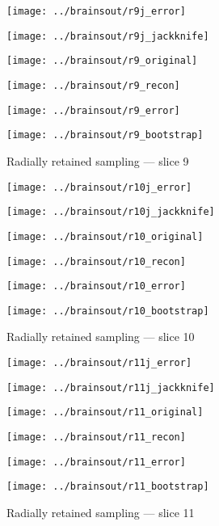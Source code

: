 \documentclass[review,supplement,onefignum,onetabnum,juq]{siamonline181217}
\begin{document}
\begin{figure}
\begin{centering}

\parbox{\imsize}{\texttt{[image: ../brainsout/r9j\_error]}}
\parbox{\imsize}{\texttt{[image: ../brainsout/r9j\_jackknife]}}

\vspace{\vertsep}

\parbox{\imsize}{\texttt{[image: ../brainsout/r9\_original]}}
\parbox{\imsize}{\texttt{[image: ../brainsout/r9\_recon]}}

\vspace{\vertsep}

\parbox{\imsize}{\texttt{[image: ../brainsout/r9\_error]}}
\parbox{\imsize}{\texttt{[image: ../brainsout/r9\_bootstrap]}}

\end{centering}
\caption{Radially retained sampling --- slice 9}
\end{figure}


\begin{figure}
\begin{centering}

\parbox{\imsize}{\texttt{[image: ../brainsout/r10j\_error]}}
\parbox{\imsize}{\texttt{[image: ../brainsout/r10j\_jackknife]}}

\vspace{\vertsep}

\parbox{\imsize}{\texttt{[image: ../brainsout/r10\_original]}}
\parbox{\imsize}{\texttt{[image: ../brainsout/r10\_recon]}}

\vspace{\vertsep}

\parbox{\imsize}{\texttt{[image: ../brainsout/r10\_error]}}
\parbox{\imsize}{\texttt{[image: ../brainsout/r10\_bootstrap]}}

\end{centering}
\caption{Radially retained sampling --- slice 10}
\end{figure}


\begin{figure}
\begin{centering}

\parbox{\imsize}{\texttt{[image: ../brainsout/r11j\_error]}}
\parbox{\imsize}{\texttt{[image: ../brainsout/r11j\_jackknife]}}

\vspace{\vertsep}

\parbox{\imsize}{\texttt{[image: ../brainsout/r11\_original]}}
\parbox{\imsize}{\texttt{[image: ../brainsout/r11\_recon]}}

\vspace{\vertsep}

\parbox{\imsize}{\texttt{[image: ../brainsout/r11\_error]}}
\parbox{\imsize}{\texttt{[image: ../brainsout/r11\_bootstrap]}}

\end{centering}
\caption{Radially retained sampling --- slice 11}
\end{figure}
\end{document}
